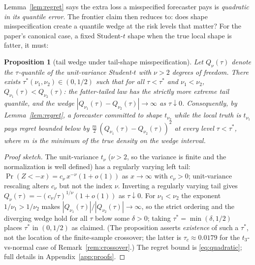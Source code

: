 \documentclass[11pt]{article}
\newtheorem{proposition}{Proposition}
\theoremstyle{remark}
\begin{document}
Lemma~\ref{lem:regret} says the extra loss a misspecified forecaster
pays is \emph{quadratic in its quantile error}. The frontier claim then
reduces to: does shape misspecification create a quantile wedge at the
risk levels that matter? For the paper's canonical case, a fixed Student-$t$ shape when the true local shape is fatter, it must:

\begin{proposition}[tail wedge under tail-shape misspecification]
\label{prop:wedge}
Let $Q_\nu(\tau)$ denote the $\tau$-quantile of the unit-variance
Student-$t$ with $\nu > 2$ degrees of freedom. There exists
$\tau^*(\nu_1,\nu_2) \in (0, 1/2)$ such that for all
$\tau < \tau^*$ and $\nu_1 < \nu_2$,
$Q_{\nu_1}(\tau) < Q_{\nu_2}(\tau)$: the fatter-tailed law has the
strictly more extreme tail quantile, and the wedge
$|Q_{\nu_1}(\tau) - Q_{\nu_2}(\tau)| \to \infty$ as
$\tau \downarrow 0$. Consequently, by Lemma~\ref{lem:regret}, a
forecaster committed to shape $t_{\nu_2}$ while the local truth is
$t_{\nu_1}$ pays regret bounded below by
$\tfrac{m}{2}\,(Q_{\nu_1}(\tau) - Q_{\nu_2}(\tau))^2$ at every level
$\tau < \tau^*$, where $m$ is the minimum of the true density on the
wedge interval.
\end{proposition}
\begin{proof}[Proof sketch]
The unit-variance $t_\nu$ ($\nu>2$, so the variance is finite and the
normalization is well defined) has a regularly varying left tail:
$\Pr(Z < -x) = c_\nu\, x^{-\nu}(1 + o(1))$ as $x \to \infty$ with
$c_\nu > 0$; unit-variance rescaling alters $c_\nu$ but not the index
$\nu$. Inverting a regularly varying tail \citep{embrechts1997} gives
$Q_\nu(\tau) = -(c_\nu/\tau)^{1/\nu}(1+o(1))$ as $\tau \downarrow 0$.
For $\nu_1 < \nu_2$ the exponent $1/\nu_1 > 1/\nu_2$ makes
$|Q_{\nu_1}(\tau)| / |Q_{\nu_2}(\tau)| \to \infty$, so the strict
ordering and the diverging wedge hold for all $\tau$ below some
$\delta > 0$; taking $\tau^* = \min(\delta, 1/2)$ places $\tau^*$ in
$(0,1/2)$ as claimed. (The proposition asserts \emph{existence} of such
a $\tau^*$, not the location of the finite-sample crossover; the latter
is $\tau_c\approx 0.0179$ for the $t_3$-vs-normal case of
Remark~\ref{rem:crossover}.) The regret bound is \eqref{eq:quadratic};
full details in Appendix~\ref{app:proofs}.
\end{proof}
\end{document}
